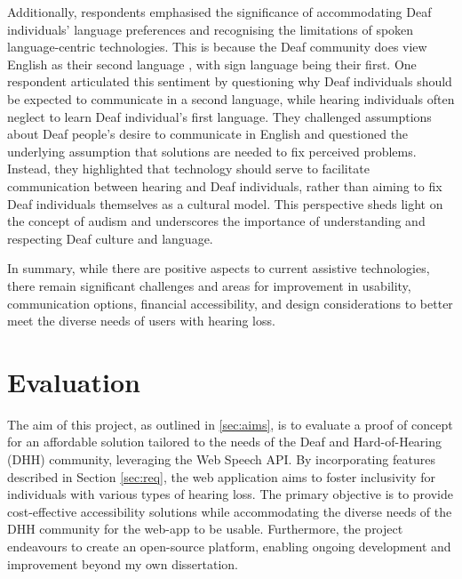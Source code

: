 \documentclass{l4proj}
\begin{document}
Additionally, respondents emphasised the significance of accommodating Deaf individuals' language preferences and recognising the limitations of spoken language-centric technologies. This is because the Deaf community does view English as their second language \citep{Morgan_2016}, with sign language being their first. One respondent articulated this sentiment by questioning why Deaf individuals should be expected to communicate in a second language, while hearing individuals often neglect to learn Deaf individual's first language. They challenged assumptions about Deaf people's desire to communicate in English and questioned the underlying assumption that solutions are needed to fix perceived problems. Instead, they highlighted that technology should serve to facilitate communication between hearing and Deaf individuals, rather than aiming to fix Deaf individuals themselves as a cultural model. This perspective sheds light on the concept of audism and underscores the importance of understanding and respecting Deaf culture and language.

In summary, while there are positive aspects to current assistive technologies, there remain significant challenges and areas for improvement in usability, communication options, financial accessibility, and design considerations to better meet the diverse needs of users with hearing loss.


\chapter{Evaluation} 
\label{sec:evaluation}

The aim of this project, as outlined in \ref{sec:aims}, is to evaluate a proof of concept for an affordable solution tailored to the needs of the Deaf and Hard-of-Hearing (DHH) community, leveraging the Web Speech API. By incorporating features described in Section \ref{sec:req}, the web application aims to foster inclusivity for individuals with various types of hearing loss. The primary objective is to provide cost-effective accessibility solutions while accommodating the diverse needs of the DHH community for the web-app to be usable. Furthermore, the project endeavours to create an open-source platform, enabling ongoing development and improvement beyond my own dissertation.
\end{document}
